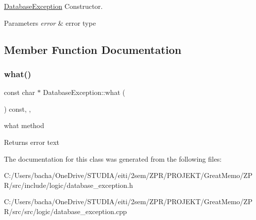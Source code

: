 \hyperlink{class_database_exception}{Database\+Exception} Constructor. 


\begin{DoxyParams}{Parameters}
{\em error} & error type \\
\hline
\end{DoxyParams}


\subsection{Member Function Documentation}
\mbox{\label{class_database_exception_a75c0ac2e93f46c82d22892aac334d854}} 
\subsubsection{\texorpdfstring{what()}{what()}}
{\footnotesize\ttfamily const char $\ast$ Database\+Exception\+::what (\begin{DoxyParamCaption}{ }\end{DoxyParamCaption}) const\hspace{0.3cm}{\ttfamily [override]}, {\ttfamily [virtual]}, {\ttfamily [noexcept]}}



what method 

\begin{DoxyReturn}{Returns}
error text 
\end{DoxyReturn}


The documentation for this class was generated from the following files\+:\begin{DoxyCompactItemize}
\item 
C\+:/\+Users/bacha/\+One\+Drive/\+S\+T\+U\+D\+I\+A/eiti/2sem/\+Z\+P\+R/\+P\+R\+O\+J\+E\+K\+T/\+Great\+Memo/\+Z\+P\+R/src/include/logic/database\+\_\+exception.\+h\item 
C\+:/\+Users/bacha/\+One\+Drive/\+S\+T\+U\+D\+I\+A/eiti/2sem/\+Z\+P\+R/\+P\+R\+O\+J\+E\+K\+T/\+Great\+Memo/\+Z\+P\+R/src/src/logic/database\+\_\+exception.\+cpp\end{DoxyCompactItemize}
